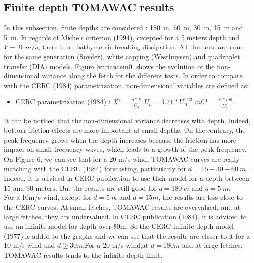 \subsection{Finite depth TOMAWAC results}
In this subsection, finite depths are considered : 180~m, 60~m, 30~m, 15~m and 5~m. In regards of Miche's criterion (1994), excepted for a 5 meters depth and $V = 20~m/s$, there is no bathymetric breaking dissipation. All the tests are done for the same generation (Snyder), white capping (Westhuysen) and quadruplet transfer (DIA) models. Figure \ref{variancem0} shows the evolution of the non-dimensional variance along the fetch for the different tests. In order to compare with the CERC (1984) parametrization, non-dimensional variables are defined as:\\
\begin{itemize}
\item CERC parametrization (1984) :
\subitem $X* = \frac{g*X}{U_a}$
\subitem $U_a = 0.71*U_{10}^{1.23}$
\subitem $m0* = \frac{g^2*m0}{U_a^4}$
\end{itemize}
It can be noticed that the non-dimensional variance decreases with depth. Indeed, bottom friction effects are more important at small depths. On the contrary, the peak frequency grows when the depth increases because the friction has more impact on small frequency waves, which leads to a growth of the peak frequency.\\
On Figure 6, we can see that for a 20 m/s wind, TOMAWAC curves are really matching with the CERC (1984) forecasting, particularly for $d = 15 - 30 - 60~m$. Indeed, it is adviced in CERC publication to use their model for a depth between 15 and 90 meters. But the results are still good for $d = 180~m$ and $d = 5~m$.\\
For a 10m/s wind, except for $d = 5~m $ and $d = 15 m$, the results are less close to the CERC curves. At small fetches, TOMAWAC results are overvalued, and at large fetches, they are undervalued. In CERC publication (1984), it is adviced to use an infinite model for depth over 90m. So the CERC infinite depth model (1977) is added to the graphs and we can see that the results are closer to it for a 10 m/s wind and $d \geq 30m$.For a 20 m/s wind,at $d = 180m$ and at large fetches, TOMAWAC results tends to the infinite depth limit.
